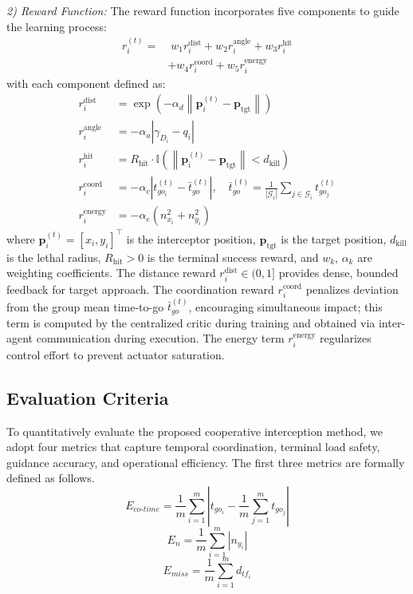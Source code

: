 \documentclass[lettersize,journal]{IEEEtran}
\begin{document}
\emph{2) Reward Function:} The reward function incorporates five components to guide the learning process:
\begin{equation}
\label{eq:reward_function}
\begin{split}
r_i^{(t)} =& \; w_1 r_i^{\text{dist}} + w_2 r_i^{\text{angle}} + w_3 r_i^{\text{hit}} \\
&+ w_4 r_i^{\text{coord}} + w_5 r_i^{\text{energy}}
\end{split}
\end{equation}
with each component defined as:
\begin{align}
r_i^{\text{dist}} &= \exp\!\left(-\alpha_d \left\|\mathbf{p}_i^{(t)} - \mathbf{p}_{\text{tgt}}\right\|\right) \label{eq:r_dist}\\
r_i^{\text{angle}} &= -\alpha_a \left|\gamma_{D_i} - q_i\right| \label{eq:r_angle}\\
r_i^{\text{hit}} &= R_{\text{hit}} \cdot \mathbb{I}\!\left(\left\|\mathbf{p}_i^{(t)} - \mathbf{p}_{\text{tgt}}\right\| < d_{\text{kill}}\right) \label{eq:r_hit}\\
r_i^{\text{coord}} &= -\alpha_c \left| t_{go_i}^{(t)} - \bar{t}_{go}^{(t)} \right|, \quad \bar{t}_{go}^{(t)} = \frac{1}{|\mathcal{G}_i|}\sum_{j \in \mathcal{G}_i} t_{go_j}^{(t)} \label{eq:r_coord}\\
r_i^{\text{energy}} &= -\alpha_e \left(n_{x_i}^2 + n_{y_i}^2\right) \label{eq:r_energy}
\end{align}
where $\mathbf{p}_i^{(t)} = [x_i, y_i]^\top$ is the interceptor position, $\mathbf{p}_{\text{tgt}}$ is the target position, $d_{\text{kill}}$ is the lethal radius, $R_{\text{hit}} > 0$ is the terminal success reward, and $w_k$, $\alpha_k$ are weighting coefficients. The distance reward $r_i^{\text{dist}} \in (0,1]$ provides dense, bounded feedback for target approach. The coordination reward $r_i^{\text{coord}}$ penalizes deviation from the group mean time-to-go $\bar{t}_{go}^{(t)}$, encouraging simultaneous impact; this term is computed by the centralized critic during training and obtained via inter-agent communication during execution. The energy term $r_i^{\text{energy}}$ regularizes control effort to prevent actuator saturation.

\subsection{Evaluation Criteria}
\label{subsec:eval}

To quantitatively evaluate the proposed cooperative interception method, we adopt four metrics that capture temporal coordination, terminal load safety, guidance accuracy, and operational efficiency. The first three metrics are formally defined as follows.
\begin{equation}
\label{E1}
E_{co\text{-}time} = \frac{1}{m}\sum_{i=1}^{m} \left| t_{go_i} - \frac{1}{m}\sum_{j=1}^{m} t_{go_j} \right|
\end{equation}
\begin{equation}
\label{E2}
E_{n} = \frac{1}{m}\sum_{i=1}^{m} |n_{y_i}|
\end{equation}
\begin{equation}
\label{E3}
E_{miss} = \frac{1}{m}\sum_{i=1}^{m} d_{tf_i}
\end{equation}
\end{document}
